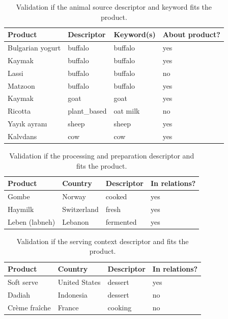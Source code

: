 \documentclass[sigconf]{acmart-txmm}
\begin{document}
\begin{table}[h]
  \centering
  \caption{Validation if the animal source descriptor and keyword fits the product.}
  \label{tab:val_animal}
  \begin{tabular}{llll}
    \toprule
    \textbf{Product} & \textbf{Descriptor} & \textbf{Keyword(s)} & \textbf{About product?} \\
    \midrule
    Bulgarian yogurt & buffalo & buffalo & yes \\
    Kaymak & buffalo & buffalo & yes \\
    Lassi & buffalo & buffalo & no \\
    Matzoon & buffalo & buffalo & yes \\
    Kaymak & goat & goat & yes \\
    Ricotta & plant\_based & oat milk & no \\
    Yayık ayranı & sheep & sheep & yes \\
    Kalvdans & cow & cow & yes \\
    \bottomrule
  \end{tabular}
\end{table}

\begin{table}[h]
  \centering
  \caption{Validation if the processing and preparation descriptor and fits the product.}
  \label{tab:val_processing2}
  \begin{tabular}{llll}
    \toprule
    \textbf{Product} & \textbf{Country} & \textbf{Descriptor} & \textbf{In relations?} \\
    \midrule
    Gombe & Norway & cooked & yes \\
    Haymilk & Switzerland & fresh & yes \\
    Leben (labneh) & Lebanon & fermented & yes \\
    \bottomrule
  \end{tabular}
\end{table}

\begin{table}[h]
  \centering
  \caption{Validation if the serving context descriptor and fits the product.}
  \label{tab:val_serving2}
  \begin{tabular}{llll}
    \toprule
    \textbf{Product} & \textbf{Country} & \textbf{Descriptor} & \textbf{In relations?} \\
    \midrule
    Soft serve & United States & dessert & yes \\
    Dadiah & Indonesia & dessert & no \\
    Crème fraîche & France & cooking & no \\
    \bottomrule
  \end{tabular}
\end{table}
\end{document}
